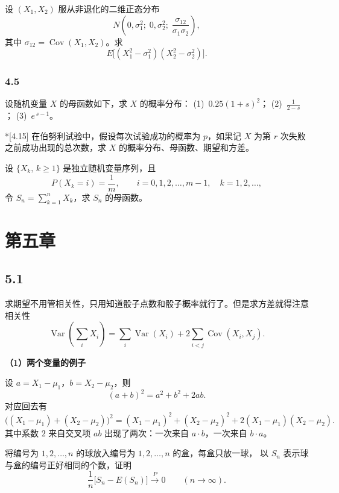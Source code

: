 \begin{homework}[4.12]
设 $(X_1,X_2)$ 服从非退化的二维正态分布  
\[
N\!\left(0,\sigma_1^2; \; 0,\sigma_2^2;\; \frac{\sigma_{12}}{\sigma_1\sigma_2}\right),
\]
其中 $\sigma_{12}=\operatorname{Cov}(X_1,X_2)$。求  
\[
E\bigl[(X_1^2-\sigma_1^2)(X_2^2-\sigma_2^2)\bigr].
\]
\end{homework}
\subsection{4.5}
\begin{homework}[4.14]
设随机变量 $X$ 的母函数如下，求 $X$ 的概率分布：  
(1)\ $0.25(1+s)^2$；  
(2)\ $\displaystyle \frac{1}{2-s}$；  
(3)\ $e^{\,s-1}$。
\end{homework}

\begin{homework}*[4.15]
在伯努利试验中，假设每次试验成功的概率为 $p$，如果记 $X$ 为第 $r$ 次失败之前成功出现的总次数，求 $X$ 的概率分布、母函数、期望和方差。
\end{homework}

\begin{homework}[4.16]
设 $\{X_k,\,k\ge 1\}$ 是独立随机变量序列，且
\[
P(X_k=i)=\frac{1}{m},\qquad i=0,1,2,\ldots,m-1,\quad k=1,2,\ldots,
\]
令 $S_n=\sum_{k=1}^{n} X_k$，求 $S_n$ 的母函数。
\end{homework}
\chapter{第五章}
\section{5.1}
\begin{dxtips}
    求期望不用管相关性，只用知道骰子点数和骰子概率就行了。但是求方差就得注意相关性
    \[
\operatorname{Var}\!\left(\sum_i X_i\right)
=\sum_i \operatorname{Var}(X_i)
+2\sum_{i<j}\operatorname{Cov}(X_i,X_j).
\]
\end{dxtips}
\textbf{（1）两个变量的例子}

设 $a=X_1-\mu_1$，$b=X_2-\mu_2$，则
\[
(a+b)^2=a^2+b^2+2ab.
\]
对应回去有
\[
\big((X_1-\mu_1)+(X_2-\mu_2)\big)^2
=(X_1-\mu_1)^2+(X_2-\mu_2)^2
+2(X_1-\mu_1)(X_2-\mu_2).
\]
其中系数 $2$ 来自交叉项 $ab$ 出现了两次：一次来自 $a\cdot b$，一次来自 $b\cdot a$。
\begin{homework}[5.3]
将编号为 $1,2,\ldots,n$ 的球放入编号为 $1,2,\ldots,n$ 的盒，每盒只放一球，
以 $S_n$ 表示球与盒的编号正好相同的个数，证明
\[
\frac1n \bigl[S_n - E(S_n)\bigr] \xrightarrow{P} 0 
\qquad (n\to\infty).
\]
\end{homework}


